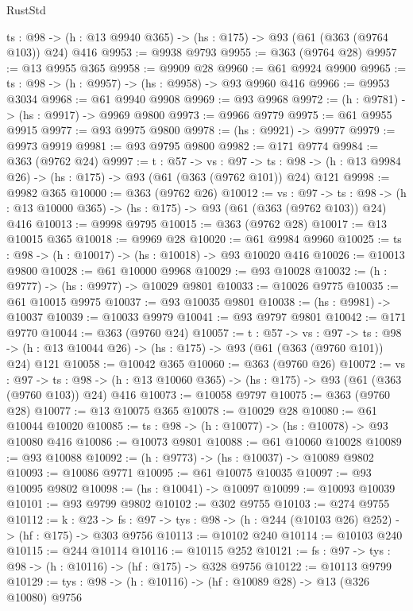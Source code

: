 \begin{lexlean}{RustStd}
\begin{coremodule}
  {ts : @98} -> (h : @13 @9940 @365) -> (hs : @175) -> @93 (@61 (@363 (@9764 @103)) @24) @416
@9953 := @9938 @9793
@9955 := @363 (@9764 @28)
@9957 := @13 @9955 @365
@9958 := @9909 @28
@9960 := @61 @9924 @9900
@9965 := {ts : @98} -> (h : @9957) -> (hs : @9958) -> @93 @9960 @416
@9966 := @9953 @3034
@9968 := @61 @9940 @9908
@9969 := @93 @9968
@9972 := (h : @9781) -> (hs : @9917) -> @9969 @9800
@9973 := @9966 @9779
@9975 := @61 @9955 @9915
@9977 := @93 @9975 @9800
@9978 := (hs : @9921) -> @9977
@9979 := @9973 @9919
@9981 := @93 @9795 @9800
@9982 := @171 @9774
@9984 := @363 (@9762 @24)
@9997 := {t : @57} ->
  {vs : @97} ->
  {ts : @98} -> (h : @13 @9984 @26) -> (hs : @175) -> @93 (@61 (@363 (@9762 @101)) @24) @121
@9998 := @9982 @365
@10000 := @363 (@9762 @26)
@10012 := {vs : @97} ->
  {ts : @98} -> (h : @13 @10000 @365) -> (hs : @175) -> @93 (@61 (@363 (@9762 @103)) @24) @416
@10013 := @9998 @9795
@10015 := @363 (@9762 @28)
@10017 := @13 @10015 @365
@10018 := @9969 @28
@10020 := @61 @9984 @9960
@10025 := {ts : @98} -> (h : @10017) -> (hs : @10018) -> @93 @10020 @416
@10026 := @10013 @9800
@10028 := @61 @10000 @9968
@10029 := @93 @10028
@10032 := (h : @9777) -> (hs : @9977) -> @10029 @9801
@10033 := @10026 @9775
@10035 := @61 @10015 @9975
@10037 := @93 @10035 @9801
@10038 := (hs : @9981) -> @10037
@10039 := @10033 @9979
@10041 := @93 @9797 @9801
@10042 := @171 @9770
@10044 := @363 (@9760 @24)
@10057 := {t : @57} ->
  {vs : @97} ->
  {ts : @98} -> (h : @13 @10044 @26) -> (hs : @175) -> @93 (@61 (@363 (@9760 @101)) @24) @121
@10058 := @10042 @365
@10060 := @363 (@9760 @26)
@10072 := {vs : @97} ->
  {ts : @98} -> (h : @13 @10060 @365) -> (hs : @175) -> @93 (@61 (@363 (@9760 @103)) @24) @416
@10073 := @10058 @9797
@10075 := @363 (@9760 @28)
@10077 := @13 @10075 @365
@10078 := @10029 @28
@10080 := @61 @10044 @10020
@10085 := {ts : @98} -> (h : @10077) -> (hs : @10078) -> @93 @10080 @416
@10086 := @10073 @9801
@10088 := @61 @10060 @10028
@10089 := @93 @10088
@10092 := (h : @9773) -> (hs : @10037) -> @10089 @9802
@10093 := @10086 @9771
@10095 := @61 @10075 @10035
@10097 := @93 @10095 @9802
@10098 := (hs : @10041) -> @10097
@10099 := @10093 @10039
@10101 := @93 @9799 @9802
@10102 := @302 @9755
@10103 := @274 @9755
@10112 := {k : @23} ->
  {fs : @97} -> {tys : @98} -> (h : @244 (@10103 @26) @252) -> (hf : @175) -> @303 @9756
@10113 := @10102 @240
@10114 := @10103 @240
@10115 := @244 @10114
@10116 := @10115 @252
@10121 := {fs : @97} -> {tys : @98} -> (h : @10116) -> (hf : @175) -> @328 @9756
@10122 := @10113 @9799
@10129 := {tys : @98} -> (h : @10116) -> (hf : @10089 @28) -> @13 (@326 @10080) @9756

\end{coremodule}
\end{lexlean}
